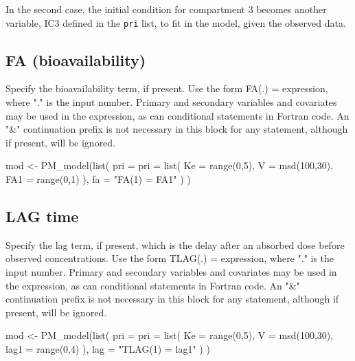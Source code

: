 \documentclass[
]{book}
\newenvironment{Shaded}{\begin{snugshade}}{\end{snugshade}}
\newcommand{\AttributeTok}[1]{\textcolor[rgb]{0.77,0.63,0.00}{#1}}
\newcommand{\DecValTok}[1]{\textcolor[rgb]{0.00,0.00,0.81}{#1}}
\newcommand{\FunctionTok}[1]{\textcolor[rgb]{0.00,0.00,0.00}{#1}}
\newcommand{\NormalTok}[1]{#1}
\newcommand{\OtherTok}[1]{\textcolor[rgb]{0.56,0.35,0.01}{#1}}
\newcommand{\StringTok}[1]{\textcolor[rgb]{0.31,0.60,0.02}{#1}}
\begin{document}
In the second case, the initial condition for compartment 3 becomes
another variable, IC3 defined in the \texttt{pri} list, to fit in the
model, given the observed data.

\hypertarget{FaR6}{%
\subsection{FA (bioavailability)}\label{FaR6}}

Specify the bioavailability term, if present. Use the form FA(.) =
expression, where "." is the input number. Primary and secondary
variables and covariates may be used in the expression, as can
conditional statements in Fortran code. An "\&" continuation prefix is not necessary in this block for any statement, although if present, will be ignored.

\begin{Shaded}
\begin{Highlighting}[]
\NormalTok{mod }\OtherTok{\textless{}{-}} \FunctionTok{PM\_model}\NormalTok{(}\FunctionTok{list}\NormalTok{(}
  \AttributeTok{pri =} \AttributeTok{pri =} \FunctionTok{list}\NormalTok{(}
    \AttributeTok{Ke =} \FunctionTok{range}\NormalTok{(}\DecValTok{0}\NormalTok{,}\DecValTok{5}\NormalTok{),}
    \AttributeTok{V =} \FunctionTok{msd}\NormalTok{(}\DecValTok{100}\NormalTok{,}\DecValTok{30}\NormalTok{),}
    \AttributeTok{FA1 =} \FunctionTok{range}\NormalTok{(}\DecValTok{0}\NormalTok{,}\DecValTok{1}\NormalTok{)}
\NormalTok{  ),}
  \AttributeTok{fa =} \StringTok{"FA(1) = FA1"}
\NormalTok{  )}
\NormalTok{)}
\end{Highlighting}
\end{Shaded}

\hypertarget{lagR6}{%
\subsection{LAG time}\label{lagR6}}

Specify the lag term, if present, which is the delay after an absorbed
dose before observed concentrations. Use the form TLAG(.) = expression, where "." is the input number. Primary and secondary variables and covariates may be used in the expression, as can conditional statements in Fortran code. An "\&" continuation prefix is not necessary in this block for any statement, although if present, will be ignored.

\begin{Shaded}
\begin{Highlighting}[]
\NormalTok{mod }\OtherTok{\textless{}{-}} \FunctionTok{PM\_model}\NormalTok{(}\FunctionTok{list}\NormalTok{(}
  \AttributeTok{pri =} \AttributeTok{pri =} \FunctionTok{list}\NormalTok{(}
    \AttributeTok{Ke =} \FunctionTok{range}\NormalTok{(}\DecValTok{0}\NormalTok{,}\DecValTok{5}\NormalTok{),}
    \AttributeTok{V =} \FunctionTok{msd}\NormalTok{(}\DecValTok{100}\NormalTok{,}\DecValTok{30}\NormalTok{),}
    \AttributeTok{lag1 =} \FunctionTok{range}\NormalTok{(}\DecValTok{0}\NormalTok{,}\DecValTok{4}\NormalTok{)}
\NormalTok{  ),}
  \AttributeTok{lag =} \StringTok{"TLAG(1) = lag1"}
\NormalTok{  )}
\NormalTok{)}
\end{Highlighting}
\end{Shaded}
\end{document}
